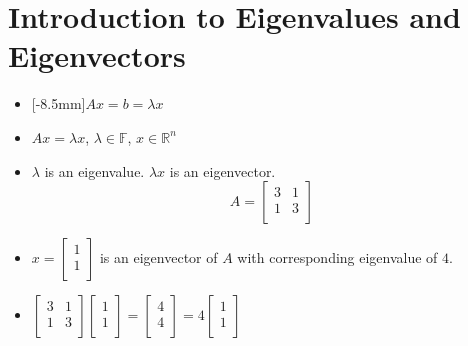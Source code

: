 \documentclass{article}
\begin{document}
\section*{Introduction to Eigenvalues and Eigenvectors}
\begin{itemize}
    \item {}[-8.5mm]$Ax=b=\lambda x$
    \item $Ax=\lambda x$, $\lambda\in\mathbb{F}$, $x\in\mathbb{R}^n$
    \item $\lambda$ is an eigenvalue. $\lambda x$ is an eigenvector.
    \begin{equation*}
        A=
        \begin{bmatrix}
            3 & 1\\
            1 & 3\\
        \end{bmatrix}
    \end{equation*}
    \item $
        x =
        \begin{bmatrix}
            1\\
            1\\
        \end{bmatrix}
    $ is an eigenvector of $A$ with corresponding eigenvalue of $4$.
    \item $
        \begin{bmatrix}
            3 & 1\\
            1 & 3\\
        \end{bmatrix}
        \begin{bmatrix}
            1\\
            1\\
        \end{bmatrix}
        =
        \begin{bmatrix}
            4\\
            4\\
        \end{bmatrix}
        = 4
        \begin{bmatrix}
            1\\
            1\\
        \end{bmatrix}
    $
    \begin{center}
\end{center}
\end{itemize}
\end{document}
